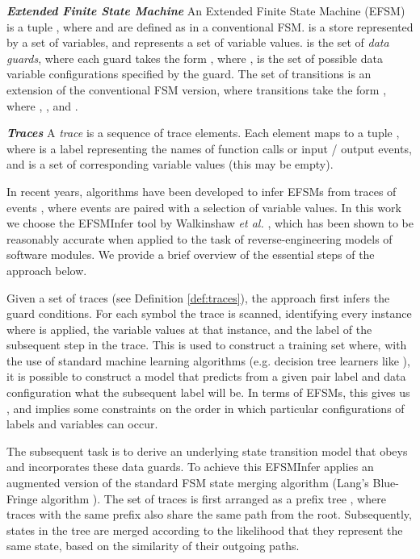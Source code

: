 \documentclass{llncs}
\begin{document}
\begin{definition}\textbf{\emph{Extended Finite State Machine}}
\label{def:efsm}
 An Extended Finite State Machine (EFSM)  is a tuple , where  and  are defined as in a conventional FSM.  is a store represented by a set of variables, and  represents a set of variable values.  is the set of \emph{data guards}, where each guard  takes the form , where ,  is the set of possible data variable configurations specified by the guard. The set of transitions  is an extension of the conventional FSM version, where transitions take the form , where , , and . 
\end{definition}
\begin{definition}\textbf{\emph{Traces}}
\label{def:traces}
A \emph{trace}  is a sequence of  trace elements. Each element  maps to a tuple , where  is a label representing the names of function calls or input / output events, and  is a set of corresponding variable values (this may be empty).
\end{definition}

In recent years, algorithms have been developed to infer EFSMs from traces of events \cite{Lorenzoli08,Walkinshaw13}, where events are paired with a selection of variable values. In this work we choose the EFSMInfer tool by Walkinshaw \emph{et al.} \cite{Walkinshaw13}, which has been shown to be reasonably accurate when applied to the task of reverse-engineering models of software modules. We provide a brief overview of the essential steps of the approach below.

Given a set of traces (see Definition \ref{def:traces}), the approach first infers the guard conditions. For each symbol  the trace is scanned, identifying every instance where  is applied, the variable values  at that instance, and the label of the subsequent step in the trace. This is used to construct a training set where, with the use of standard machine learning algorithms (e.g. decision tree learners like \cite{Quinlan93}), it is possible to construct a model that predicts from a given pair label and data configuration what the subsequent label will be. In terms of EFSMs, this gives us , and implies some constraints on the order in which particular configurations of labels and variables can occur.

The subsequent task is to derive an underlying state transition model that obeys and incorporates these data guards. To achieve this EFSMInfer applies an augmented version of the standard FSM state merging algorithm (Lang's Blue-Fringe algorithm \cite{Lang98}). The set of traces is first arranged as a prefix tree \cite{WalkinshawStam13}, where traces with the same prefix also share the same path from the root. Subsequently, states in the tree are merged according to the likelihood that they represent the same state, based on the similarity of their outgoing paths.
\end{document}
